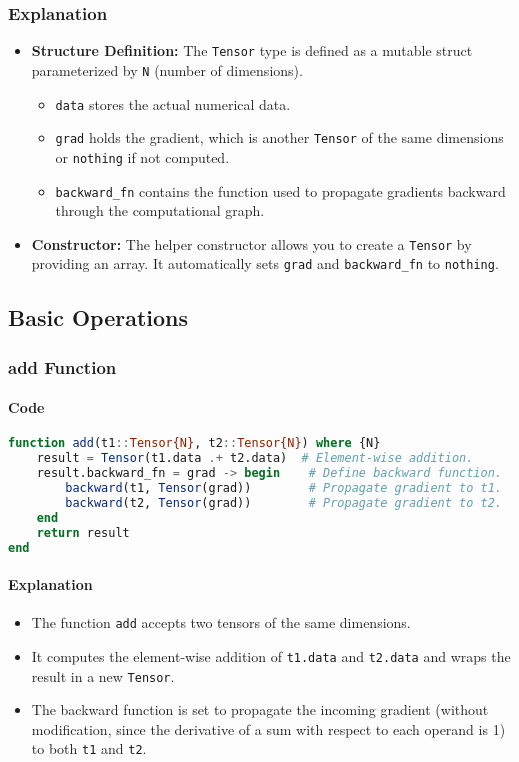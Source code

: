 \documentclass[11pt]{article}
\begin{document}
\subsubsection*{Explanation}
\begin{itemize}
    \item \textbf{Structure Definition:} The \texttt{Tensor} type is defined as a mutable struct parameterized by \texttt{N} (number of dimensions).
    \begin{itemize}
        \item \texttt{data} stores the actual numerical data.
        \item \texttt{grad} holds the gradient, which is another \texttt{Tensor} of the same dimensions or \texttt{nothing} if not computed.
        \item \texttt{backward\_fn} contains the function used to propagate gradients backward through the computational graph.
    \end{itemize}
    \item \textbf{Constructor:} The helper constructor allows you to create a \texttt{Tensor} by providing an array. It automatically sets \texttt{grad} and \texttt{backward\_fn} to \texttt{nothing}.
\end{itemize}

\subsection{Basic Operations}
\subsubsection{add Function}
\paragraph{Code}
\begin{lstlisting}[language=Julia]
function add(t1::Tensor{N}, t2::Tensor{N}) where {N}
    result = Tensor(t1.data .+ t2.data)  # Element-wise addition.
    result.backward_fn = grad -> begin    # Define backward function.
        backward(t1, Tensor(grad))        # Propagate gradient to t1.
        backward(t2, Tensor(grad))        # Propagate gradient to t2.
    end
    return result
end
\end{lstlisting}

\paragraph{Explanation}
\begin{itemize}
    \item The function \texttt{add} accepts two tensors of the same dimensions.
    \item It computes the element-wise addition of \texttt{t1.data} and \texttt{t2.data} and wraps the result in a new \texttt{Tensor}.
    \item The backward function is set to propagate the incoming gradient (without modification, since the derivative of a sum with respect to each operand is 1) to both \texttt{t1} and \texttt{t2}.
\end{itemize}
\end{document}
